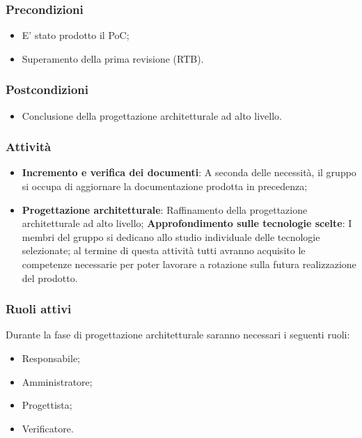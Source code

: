 \subsubsection{Precondizioni}
\begin{itemize}
    \item E’ stato prodotto il PoC;
    \item Superamento della prima revisione (RTB).
\end{itemize}

\subsubsection{Postcondizioni}
\begin{itemize}
    \item Conclusione della progettazione architetturale ad alto livello.
\end{itemize}

\subsubsection{Attività}
\begin{itemize}
    \item \textbf{Incremento e verifica dei documenti}: A seconda delle necessità, il gruppo si occupa di aggiornare la documentazione prodotta in precedenza;
    \item \textbf{Progettazione architetturale}: Raffinamento della progettazione architetturale ad alto livello;
        \subitem \textbf{Approfondimento sulle tecnologie scelte}: I membri del gruppo si dedicano allo studio individuale delle tecnologie selezionate; al termine di questa attività tutti avranno acquisito le competenze necessarie per poter lavorare a rotazione sulla futura realizzazione del prodotto.
\end{itemize}

\subsubsection{Ruoli attivi}
Durante la fase di progettazione architetturale saranno necessari i seguenti ruoli:
\begin{itemize}
	\item Responsabile;
    \item Amministratore;
    \item Progettista;
    \item Verificatore.
\end{itemize}

